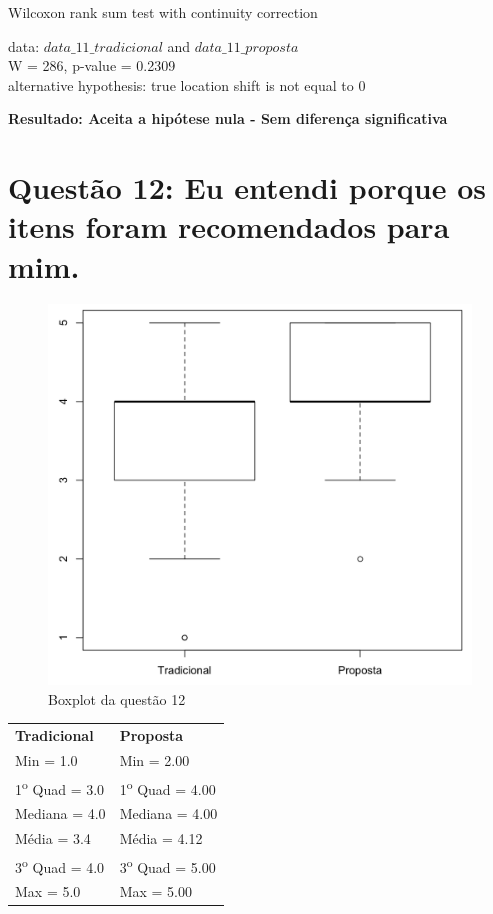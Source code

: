 Wilcoxon rank sum test with continuity correction

\noindent
data:  $data\_11\_tradicional$ and $data\_11\_proposta$\\
W = 286, p-value = 0.2309\\
alternative hypothesis: true location shift is not equal to 0

\noindent
\textbf{Resultado: Aceita a hipótese nula - Sem diferença significativa}

\newpage
\section{Questão 12: Eu entendi porque os itens foram recomendados para mim.}

\begin{figure}[htb]
  \caption{\label{fig:questao12-boxplot}Boxplot da questão 12}
  \begin{center}
      \includegraphics[scale=0.4]{./Figuras/questao12-boxplot.png}
  \end{center}
\end{figure}

\begin{table}[h]
\begin{tabular}{p{}p{}}
\textbf{Tradicional} & \textbf{Proposta} \\
Min = 1.0 & Min = 2.00\\
1\textsuperscript{o} Quad = 3.0 & 1\textsuperscript{o} Quad = 4.00\\
Mediana = 4.0 & Mediana = 4.00\\
Média = 3.4 & Média = 4.12\\
3\textsuperscript{o} Quad = 4.0 & 3\textsuperscript{o} Quad = 5.00\\
Max = 5.0 & Max = 5.00\\
\end{tabular}
\end{table}

